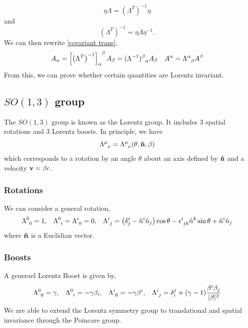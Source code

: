 \documentclass{book}
\begin{document}
\begin{equation}
	\eta\Lambda = (\Lambda^{T})^{-1}\eta
\end{equation}
and
\begin{equation}
	(\Lambda^T)^{-1} = \eta\Lambda\eta^{-1}.
\end{equation}
We can then rewrite \eqref{covariant trans},
\begin{align}
	A_{\alpha} = \left[\left(\Lambda^T\right)^{-1}\right]\indices{_{\alpha}^{\beta}}A_{\beta}= (\Lambda^{-1})\indices{^{\beta}_{\alpha}}A_{\beta} && A^{\alpha}=\Lambda\indices{^{\alpha}_{\beta}}A^{\beta}
\end{align}
From this, we can prove whether certain quantities are Lorentz invariant. 
\subsection{$SO(1,3)$ group}
The $SO(1,3)$ group is known as the Lorentz group. It includes 3 spatial rotations and 3 Lorentz boosts. In principle, we have
\begin{equation}
	\Lambda\indices{^{\mu}_{\nu}} = \Lambda\indices{^{\mu}_{\nu}}(\theta, \vu{n}, \beta)
\end{equation}
which corresponds to a rotation by an angle $\theta$ about an axis defined by $\vu{n}$ and a velocity $\vb{v} = \beta c$.
\subsubsection{Rotations}
We can consider a general rotation,
\begin{align}
	\Lambda\indices{^0_0} = 1, && \Lambda\indices{^0_i} = \Lambda\indices{^i_0} = 0, && \Lambda\indices{^i_j} = \left(\delta_j^i - \hat{n}^i\hat{n}_j\right)\cos\theta - \epsilon\indices{^i_{jk}}\hat{n}^k\sin\theta + \hat{n}^i\hat{n}_j
\end{align}
where $\vu{n}$ is a Euclidian vector.

\subsubsection{Boosts}
A generael Lorentz Boost is given by,
\begin{align}
	\Lambda\indices{^0_0} = \gamma, && \Lambda\indices{^0_i} = -\gamma\beta_i, && \Lambda\indices{^i_0} = -\gamma\beta^i, && \Lambda\indices{^i_j} = \delta_i^j + (\gamma - 1)\frac{\beta^i\beta_j}{|\beta|^2}
\end{align}
We are able to extend the Lorentz symmetry group to translational and spatial invariance through the Poincare group.
\end{document}
